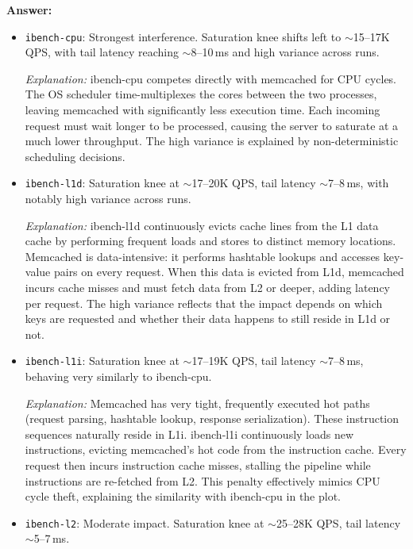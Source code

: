\textbf{Answer:}
\begin{itemize}
    \item \texttt{ibench-cpu}: Strongest interference. Saturation knee shifts left to
    $\sim$15--17K QPS, with tail latency reaching $\sim$8--10\,ms and high variance
    across runs.

    \textit{Explanation:} ibench-cpu competes directly with memcached for CPU cycles.
    The OS scheduler time-multiplexes the cores between the two processes, leaving
    memcached with significantly less execution time. Each incoming request must wait
    longer to be processed, causing the server to saturate at a much lower throughput.
    The high variance is explained by non-deterministic scheduling decisions.

    \item \texttt{ibench-l1d}: Saturation knee at $\sim$17--20K QPS, tail latency
    $\sim$7--8\,ms, with notably high variance across runs.

    \textit{Explanation:} ibench-l1d continuously evicts cache lines from the L1 data
    cache by performing frequent loads and stores to distinct memory locations.
    Memcached is data-intensive: it performs hashtable lookups and accesses key-value
    pairs on every request. When this data is evicted from L1d, memcached incurs
    cache misses and must fetch data from L2 or deeper, adding latency per request.
    The high variance reflects that the impact depends on which keys are requested and
    whether their data happens to still reside in L1d or not.

    \item \texttt{ibench-l1i}: Saturation knee at $\sim$17--19K QPS, tail latency
    $\sim$7--8\,ms, behaving very similarly to ibench-cpu.

    \textit{Explanation:} Memcached has very tight, frequently executed hot paths
    (request parsing, hashtable lookup, response serialization). These instruction
    sequences naturally reside in L1i. ibench-l1i continuously loads new instructions,
    evicting memcached's hot code from the instruction cache. Every request then incurs
    instruction cache misses, stalling the pipeline while instructions are re-fetched
    from L2. This penalty effectively mimics CPU cycle theft, explaining the similarity
    with ibench-cpu in the plot.
    \item \texttt{ibench-l2}: Moderate impact. Saturation knee at $\sim$25--28K QPS,
    tail latency $\sim$5--7\,ms.


\end{itemize}
